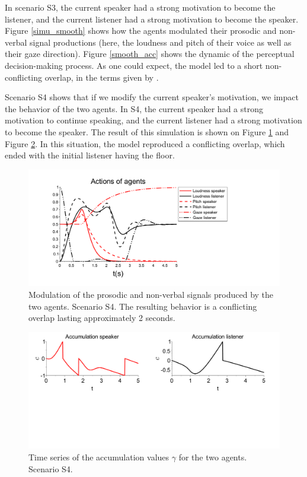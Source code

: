 \documentclass[twocolumn]{svjour3}
\begin{document}
In scenario S3, the current speaker had a strong motivation to become the listener, and the current listener had a strong motivation to become the speaker. Figure \ref{simu_smooth} shows how the agents modulated their prosodic and non-verbal signal productions (here, the loudness and pitch of their voice as well as their gaze direction). Figure \ref{smooth_acc} shows the dynamic of the perceptual decision-making process. As one could expect, the model led to a short non-conflicting overlap, in the terms given by \citep{schegloff_overlapping_2000}. 

Scenario S4 shows that if we modify the current speaker's motivation, we impact the behavior of the two agents. In S4, the current speaker had a strong motivation to continue speaking, and the current listener had a strong motivation to become the speaker. The result of this simulation is shown on Figure \ref{simu_interruption} and  Figure \ref{inter_acc}. In this situation, the model reproduced a conflicting overlap, which ended with the initial listener having the floor.  

\begin{figure}
  \centering
  \includegraphics[width=\linewidth]{figure/emerg_sc1.pdf}
  \caption{Modulation of the prosodic and non-verbal signals produced by the two agents. Scenario S4. The resulting behavior is a conflicting overlap lasting approximately 2 seconds.}
  \label{simu_interruption}
\end{figure}

\begin{figure}
  \centering
  \includegraphics[width=\linewidth]{figure/acc_sc4_small.pdf}
  \caption{Time series of the accumulation values $\gamma$ for the two agents. Scenario S4.}
  \label{inter_acc}
\end{figure}
\end{document}
